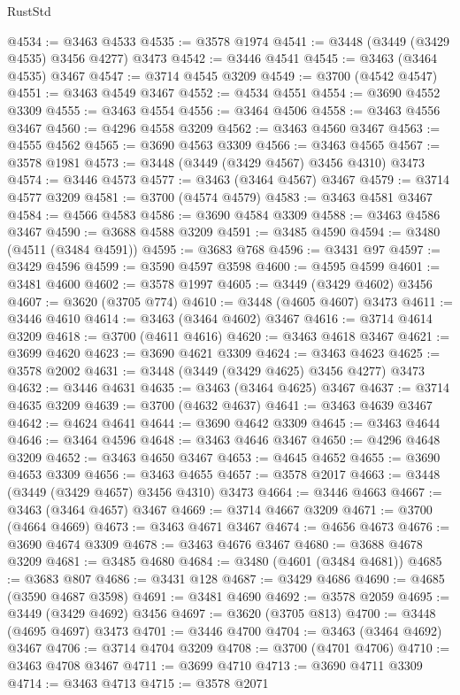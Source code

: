 \begin{lexlean}{RustStd}
\begin{coremodule}
{{{{{{{{{{{{{{{{{{{@4534 := @3463 @4533
@4535 := @3578 @1974
@4541 := @3448 (@3449 (@3429 @4535) @3456 @4277) @3473
@4542 := @3446 @4541
@4545 := @3463 (@3464 @4535) @3467
@4547 := @3714 @4545 @3209
@4549 := @3700 (@4542 @4547)
@4551 := @3463 @4549 @3467
@4552 := @4534 @4551
@4554 := @3690 @4552 @3309
@4555 := @3463 @4554
@4556 := @3464 @4506
@4558 := @3463 @4556 @3467
@4560 := @4296 @4558 @3209
@4562 := @3463 @4560 @3467
@4563 := @4555 @4562
@4565 := @3690 @4563 @3309
@4566 := @3463 @4565
@4567 := @3578 @1981
@4573 := @3448 (@3449 (@3429 @4567) @3456 @4310) @3473
@4574 := @3446 @4573
@4577 := @3463 (@3464 @4567) @3467
@4579 := @3714 @4577 @3209
@4581 := @3700 (@4574 @4579)
@4583 := @3463 @4581 @3467
@4584 := @4566 @4583
@4586 := @3690 @4584 @3309
@4588 := @3463 @4586 @3467
@4590 := @3688 @4588 @3209
@4591 := @3485 @4590
@4594 := @3480 (@4511 (@3484 @4591))
@4595 := @3683 @768
@4596 := @3431 @97
@4597 := @3429 @4596
@4599 := @3590 @4597 @3598
@4600 := @4595 @4599
@4601 := @3481 @4600
@4602 := @3578 @1997
@4605 := @3449 (@3429 @4602) @3456
@4607 := @3620 (@3705 @774)
@4610 := @3448 (@4605 @4607) @3473
@4611 := @3446 @4610
@4614 := @3463 (@3464 @4602) @3467
@4616 := @3714 @4614 @3209
@4618 := @3700 (@4611 @4616)
@4620 := @3463 @4618 @3467
@4621 := @3699 @4620
@4623 := @3690 @4621 @3309
@4624 := @3463 @4623
@4625 := @3578 @2002
@4631 := @3448 (@3449 (@3429 @4625) @3456 @4277) @3473
@4632 := @3446 @4631
@4635 := @3463 (@3464 @4625) @3467
@4637 := @3714 @4635 @3209
@4639 := @3700 (@4632 @4637)
@4641 := @3463 @4639 @3467
@4642 := @4624 @4641
@4644 := @3690 @4642 @3309
@4645 := @3463 @4644
@4646 := @3464 @4596
@4648 := @3463 @4646 @3467
@4650 := @4296 @4648 @3209
@4652 := @3463 @4650 @3467
@4653 := @4645 @4652
@4655 := @3690 @4653 @3309
@4656 := @3463 @4655
@4657 := @3578 @2017
@4663 := @3448 (@3449 (@3429 @4657) @3456 @4310) @3473
@4664 := @3446 @4663
@4667 := @3463 (@3464 @4657) @3467
@4669 := @3714 @4667 @3209
@4671 := @3700 (@4664 @4669)
@4673 := @3463 @4671 @3467
@4674 := @4656 @4673
@4676 := @3690 @4674 @3309
@4678 := @3463 @4676 @3467
@4680 := @3688 @4678 @3209
@4681 := @3485 @4680
@4684 := @3480 (@4601 (@3484 @4681))
@4685 := @3683 @807
@4686 := @3431 @128
@4687 := @3429 @4686
@4690 := @4685 (@3590 @4687 @3598)
@4691 := @3481 @4690
@4692 := @3578 @2059
@4695 := @3449 (@3429 @4692) @3456
@4697 := @3620 (@3705 @813)
@4700 := @3448 (@4695 @4697) @3473
@4701 := @3446 @4700
@4704 := @3463 (@3464 @4692) @3467
@4706 := @3714 @4704 @3209
@4708 := @3700 (@4701 @4706)
@4710 := @3463 @4708 @3467
@4711 := @3699 @4710
@4713 := @3690 @4711 @3309
@4714 := @3463 @4713
@4715 := @3578 @2071
}}}}}}}}}}}}}}}}}}}
\end{coremodule}
\end{lexlean}
